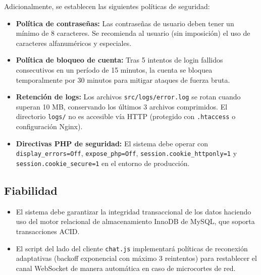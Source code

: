 \documentclass[11pt,a4paper]{report}
\begin{document}
Adicionalmente, se establecen las siguientes políticas de seguridad:
\begin{itemize}
    \item \textbf{Política de contraseñas:} Las contraseñas de usuario deben tener un mínimo de 8 caracteres. Se recomienda al usuario (sin imposición) el uso de caracteres alfanuméricos y especiales.
    \item \textbf{Política de bloqueo de cuenta:} Tras 5 intentos de login fallidos consecutivos en un período de 15 minutos, la cuenta se bloquea temporalmente por 30 minutos para mitigar ataques de fuerza bruta.
    \item \textbf{Retención de logs:} Los archivos \texttt{src/logs/error.log} se rotan cuando superan 10 MB, conservando los últimos 3 archivos comprimidos. El directorio \texttt{logs/} no es accesible vía HTTP (protegido con \texttt{.htaccess} o configuración Nginx).
    \item \textbf{Directivas PHP de seguridad:} El sistema debe operar con \texttt{display\_errors=Off}, \texttt{expose\_php=Off}, \texttt{session.cookie\_httponly=1} y \texttt{session.cookie\_secure=1} en el entorno de producción.
\end{itemize}

\subsection{Fiabilidad}
\begin{itemize}
    \item El sistema debe garantizar la integridad transaccional de los datos haciendo uso del motor relacional de almacenamiento InnoDB de MySQL, que soporta transacciones ACID.
    \item El script del lado del cliente \texttt{chat.js} implementará políticas de reconexión adaptativas (backoff exponencial con máximo 3 reintentos) para restablecer el canal WebSocket de manera automática en caso de microcortes de red.
\end{itemize}
\end{document}
